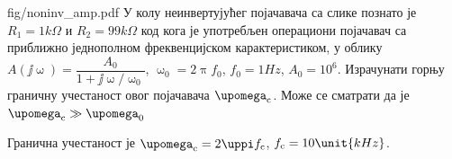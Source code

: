 \begin{slikaDesno}{fig/noninv_amp.pdf}
\PID
У колу неинвертујућег појачавача са слике познато је $R_1 = 1\unit{k\Omega}$ и $R_2 = 99\unit{k\Omega}$
код кога је употребљен 
операциони појачавач са приближно једнополном фреквенцијском карактеристиком, у облику 
$A(\jj\upomega) = \dfrac{A_0}{1 + \jj\upomega/\upomega_0}$, $\upomega_0 = 2\uppi f_0$, $f_0 = 1\unit{Hz}$, $A_0 = 10^6$.
Израчунати горњу граничну учестаност овог појачавача $\upomega_{\rm c}$. Може се сматрати да је $\upomega_{\rm c} \gg \upomega_{0}$
\end{slikaDesno}

\REZULTAT

Гранична учестаност је $\upomega_{\rm c} = 2\uppi f_{\rm c}$, $f_{\rm c} = 10\unit{kHz}$. 